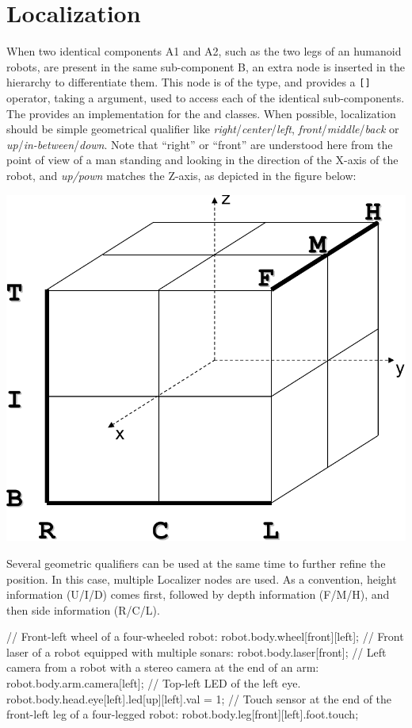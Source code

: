\section{Localization}
When two identical components A1 and A2, such as the two legs of an humanoid
robots, are present in the same sub-component B, an extra node is inserted
in the hierarchy to differentiate them. This node is of the
 type, and provides a \lstinline{[]} operator, taking a
 argument, used to access each of the identical
sub-components.  The \usdk provides an implementation for the
 and  classes.  When possible,
localization should be simple geometrical qualifier like
\textit{right}/\textit{center}/\textit{left},
\textit{front}/\textit{middle}/\textit{back} or
\textit{up}/\textit{in-between}/\textit{down}.  Note that ``right'' or
``front'' are understood here from the point of view of a man standing and
looking in the direction of the X-axis of the robot, and \textit{up/pown}
matches the Z-axis, as depicted in the figure below:

\begin{center}
  \includegraphics[width=.5\linewidth]{img/cube}
\end{center}

Several geometric qualifiers can be used at the same time to further
refine the position. In this case, multiple Localizer nodes are used.
As a convention, height information (U/I/D) comes first,
followed by depth information (F/M/H), and then side information (R/C/L).

\begin{urbiunchecked}
// Front-left wheel of a four-wheeled robot:
robot.body.wheel[front][left];
// Front laser of a robot equipped with multiple sonars:
robot.body.laser[front];
// Left camera from a robot with a stereo camera at the end of an arm:
robot.body.arm.camera[left];
// Top-left LED of the left eye.
robot.body.head.eye[left].led[up][left].val = 1;
// Touch sensor at the end of the front-left leg of a four-legged robot:
robot.body.leg[front][left].foot.touch;
\end{urbiunchecked}

